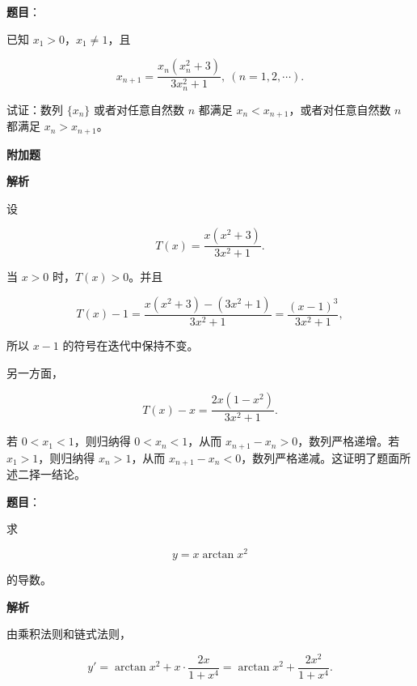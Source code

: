 \begin{answer}

\textbf{题目}：

已知 $x_1>0$，$x_1\ne1$，且

\nopagebreak[4]
\[
x_{n+1}=\frac{x_n(x_n^2+3)}{3x_n^2+1},\ (n=1,2,\cdots).
\]

试证：数列 $\{x_n\}$ 或者对任意自然数 $n$ 都满足 $x_n<x_{n+1}$，或者对任意自然数 $n$ 都满足 $x_n>x_{n+1}$。

\Needspace{0.25\textheight}
\textbf{附加题}

\textbf{解析}

设

\nopagebreak[4]
\[
T(x)=\frac{x(x^2+3)}{3x^2+1}.
\]

当 $x>0$ 时，$T(x)>0$。并且

\nopagebreak[4]
\[
T(x)-1
=\frac{x(x^2+3)-(3x^2+1)}{3x^2+1}
=\frac{(x-1)^3}{3x^2+1},
\]

所以 $x-1$ 的符号在迭代中保持不变。

另一方面，

\nopagebreak[4]
\[
T(x)-x
=\frac{2x(1-x^2)}{3x^2+1}.
\]

若 $0<x_1<1$，则归纳得 $0<x_n<1$，从而 $x_{n+1}-x_n>0$，数列严格递增。若 $x_1>1$，则归纳得 $x_n>1$，从而 $x_{n+1}-x_n<0$，数列严格递减。这证明了题面所述二择一结论。


\end{answer}
\begin{answer}

\textbf{题目}：

求

\nopagebreak[4]
\[
y=x\arctan x^2
\]

的导数。

\textbf{解析}

由乘积法则和链式法则，

\nopagebreak[4]
\[
y'=\arctan x^2+x\cdot\frac{2x}{1+x^4}
=\arctan x^2+\frac{2x^2}{1+x^4}.
\]


\end{answer}
